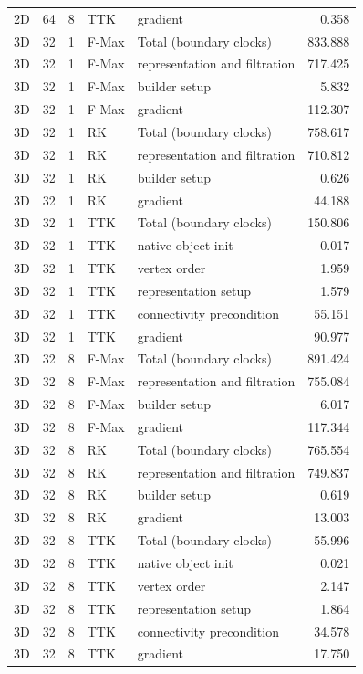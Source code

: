 \begin{tabular}{lrrllr}
2D & 64 & 8 & TTK & gradient & 0.358 \\
3D & 32 & 1 & F-Max & Total (boundary clocks) & 833.888 \\
3D & 32 & 1 & F-Max & representation and filtration & 717.425 \\
3D & 32 & 1 & F-Max & builder setup & 5.832 \\
3D & 32 & 1 & F-Max & gradient & 112.307 \\
3D & 32 & 1 & RK & Total (boundary clocks) & 758.617 \\
3D & 32 & 1 & RK & representation and filtration & 710.812 \\
3D & 32 & 1 & RK & builder setup & 0.626 \\
3D & 32 & 1 & RK & gradient & 44.188 \\
3D & 32 & 1 & TTK & Total (boundary clocks) & 150.806 \\
3D & 32 & 1 & TTK & native object init & 0.017 \\
3D & 32 & 1 & TTK & vertex order & 1.959 \\
3D & 32 & 1 & TTK & representation setup & 1.579 \\
3D & 32 & 1 & TTK & connectivity precondition & 55.151 \\
3D & 32 & 1 & TTK & gradient & 90.977 \\
3D & 32 & 8 & F-Max & Total (boundary clocks) & 891.424 \\
3D & 32 & 8 & F-Max & representation and filtration & 755.084 \\
3D & 32 & 8 & F-Max & builder setup & 6.017 \\
3D & 32 & 8 & F-Max & gradient & 117.344 \\
3D & 32 & 8 & RK & Total (boundary clocks) & 765.554 \\
3D & 32 & 8 & RK & representation and filtration & 749.837 \\
3D & 32 & 8 & RK & builder setup & 0.619 \\
3D & 32 & 8 & RK & gradient & 13.003 \\
3D & 32 & 8 & TTK & Total (boundary clocks) & 55.996 \\
3D & 32 & 8 & TTK & native object init & 0.021 \\
3D & 32 & 8 & TTK & vertex order & 2.147 \\
3D & 32 & 8 & TTK & representation setup & 1.864 \\
3D & 32 & 8 & TTK & connectivity precondition & 34.578 \\
3D & 32 & 8 & TTK & gradient & 17.750 \\
\hline
\end{tabular}
